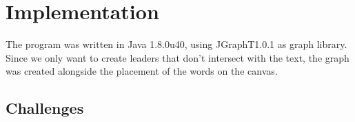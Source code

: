 \documentclass[11pt,a4paper]{vutinfth}
\begin{document}



\chapter{Implementation}
The program was written in Java 1.8.0u40, using JGraphT1.0.1\cite{JGraphT} as graph library. Since we only want to create leaders that don't intersect with the text, the graph was created alongside the placement of the words on the canvas.%
\section{Challenges}
\end{document}
